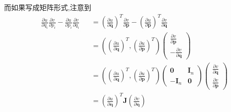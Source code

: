 \documentclass[12pt]{ctexart}
\begin{document}
而如果写成矩阵形式,注意到 
\begin{equation}
\begin{aligned}
    &\frac{\partial u}{\partial q_i}\frac{\partial v}{\partial p_i}-\frac{\partial u}{\partial p_i}\frac{\partial v}{\partial q_i}&& =\left(\frac{\partial u}{\partial\boldsymbol{q}}\right)^T\frac{\partial v}{\partial\boldsymbol{p}}-\left(\frac{\partial u}{\partial\boldsymbol{p}}\right)^T\frac{\partial v}{\partial\boldsymbol{q}} \\
    &&&=\left(\left(\frac{\partial u}{\partial\boldsymbol{q}}\right)^T,\left(\frac{\partial u}{\partial\boldsymbol{p}}\right)^T\right)\begin{pmatrix}\frac{\partial v}{\partial\boldsymbol{p}}\\-\frac{\partial v}{\partial\boldsymbol{q}}\end{pmatrix} \\
    &&&=\left(\left(\frac{\partial u}{\partial\boldsymbol{q}}\right)^T,\left(\frac{\partial u}{\partial\boldsymbol{p}}\right)^T\right)\left(\begin{array}{cc}\boldsymbol{0}&\boldsymbol{I}_n\\-\boldsymbol{I}_n&\boldsymbol{0}\end{array}\right)\left(\begin{array}{c}\frac{\partial v}{\partial\boldsymbol{q}}\\\frac{\partial v}{\partial\boldsymbol{p}}\end{array}\right) \\
    &&&=\left(\frac{\partial u}{\partial\boldsymbol{\eta}}\right)^T\boldsymbol{J}\left(\frac{\partial v}{\partial\boldsymbol{\eta}}\right)
    \end{aligned}
\end{equation}
\end{document}

